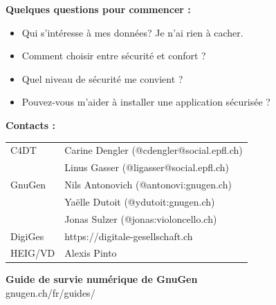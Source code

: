 \documentclass[a0paper,portrait]{baposter}
\begin{document}
\begin{poster}
{  \vspace{1em}

  \textbf{\color{c4dtblue}Quelques questions pour commencer :}
  \begin{itemize}
  \item Qui s'intéresse à mes données? Je n'ai rien à cacher.
  \item Comment choisir entre sécurité et confort ?
  \item Quel niveau de sécurité me convient ?
  \item Pouvez-vous m'aider à installer une application sécurisée ?
  \end{itemize}

  \vspace{1em}

  \begin{minipage}[t]{0.7\linewidth}
    \textbf{Contacts :} \\
    \vspace{2em}
    \small
    \begin{tabular}{ll}
    \\
    C4DT & Carine Dengler (@cdengler@social.epfl.ch) \\
         & Linus Gasser (@ligasser@social.epfl.ch) \\
    GnuGen & Nils Antonovich (@antonovi:gnugen.ch) \\
         & Yaëlle Dutoit (@ydutoit:gnugen.ch) \\
         & Jonas Sulzer (@jonas:violoncello.ch) \\
    DigiGes & https://digitale-gesellschaft.ch \\
    HEIG/VD & Alexis Pinto \\
    \end{tabular}%
  \end{minipage}%
  \begin{minipage}[t]{0.28\linewidth}
    \begin{flushright}
    \small\textbf{Guide de survie numérique de GnuGen} \\
    \vspace{1em}
    \footnotesize{gnugen.ch/fr/guides/}
    \end{flushright}
  \end{minipage}
}

%
%

\newcommand{\qrspace}{\vspace{1em}}
\newcommand{\qrcodeurl}[3][0.75cm]{
    \centering
    \begin{tikzpicture}
        \node(qrcode){\qrcode[height=2.2cm,level=H]{https://#2}};
        \node(overlay){\texttt{[image: assets/apps/\#3.png]}};
    \end{tikzpicture} \\
    \small{#2}
}


\end{poster}
\end{document}
